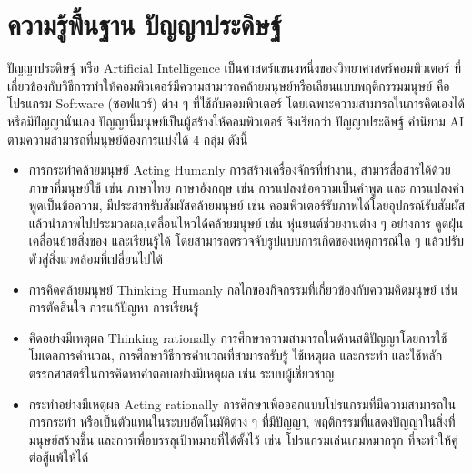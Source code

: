 								\section{ความรู้พื้นฐาน ปัญญาประดิษฐ์}
								ปัญญาประดิษฐ์ \cite{AI} หรือ Artificial Intelligence  เป็นศาสตร์แขนงหนึ่งของวิทยาศาสตร์คอมพิวเตอร์ ที่เกี่ยวข้องกับวิธีการทำให้คอมพิวเตอร์มีความสามารถคล้ายมนุษย์หรือเลียนแบบพฤติกรรมมนุษย์ คือโปรแกรม Software (ซอฟแวร์) ต่าง ๆ ที่ใช้กับคอมพิวเตอร์ โดยเฉพาะความสามารถในการคิดเองได้ หรือมีปัญญานั่นเอง ปัญญานี้มนุษย์เป็นผู้สร้างให้คอมพิวเตอร์ จึงเรียกว่า ปัญญาประดิษฐ์ 
	 คำนิยาม AI ตามความสามารถที่มนุษย์ต้องการแบ่งได้ 4 กลุ่ม ดังนี้
	 \begin{itemize}
		\item  การกระทำคล้ายมนุษย์ Acting Humanly การสร้างเครื่องจักรที่ทำงาน, สามารสื่อสารได้ด้วยภาษาที่มนุษย์ใช้ เช่น ภาษาไทย ภาษาอังกฤษ เช่น การแปลงข้อความเป็นคำพูด และ การแปลงคำพูดเป็นข้อความ, 
		มีประสาทรับสัมผัสคล้ายมนุษย์ เช่น คอมพิวเตอร์รับภาพได้โดยอุปกรณ์รับสัมผัส แล้วนำภาพไปประมวลผล,เคลื่อนไหวได้คล้ายมนุษย์ เช่น หุ่นยนต์ช่วยงานต่าง ๆ อย่างการ ดูดฝุ่น เคลื่อนย้ายสิ่งของ และเรียนรู้ได้ โดยสามารถตรวจจับรูปแบบการเกิดของเหตุการณ์ใด ๆ แล้วปรับตัวสู่สิ่งแวดล้อมที่เปลี่ยนไปได้
		\item  การคิดคล้ายมนุษย์ Thinking Humanly  กลไกของกิจกรรมที่เกี่ยวข้องกับความคิดมนุษย์ เช่น การตัดสินใจ การแก้ปัญหา การเรียนรู้
		\item  คิดอย่างมีเหตุผล Thinking rationally การศึกษาความสามารถในด้านสติปัญญาโดยการใช้โมเดลการคำนวณ, การศึกษาวิธีการคำนวณที่สามารถรับรู้ ใช้เหตุผล และกระทำ และใช้หลักตรรกศาสตร์ในการคิดหาคำตอบอย่างมีเหตุผล เช่น ระบบผู้เชี่ยวชาญ
		\item กระทำอย่างมีเหตุผล Acting rationally การศึกษาเพื่อออกแบบโปรแกรมที่มีความสามารถในการกระทำ หรือเป็นตัวแทนในระบบอัตโนมัติต่าง ๆ ที่มีปัญญา, พฤติกรรมที่แสดงปัญญาในสิ่งที่มนุษย์สร้างขึ้น และการเพื่อบรรลุเป้าหมายที่ได้ตั้งไว้ เช่น โปรแกรมเล่นเกมหมากรุก ที่จะทำให้คู่ต่อสู้แพ้ให้ได้
		
	\end{itemize}

